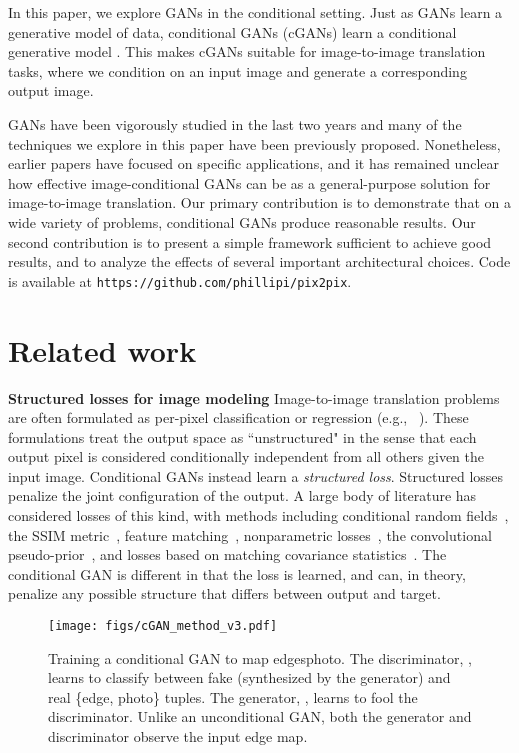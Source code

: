 \documentclass[10pt,twocolumn,letterpaper]{article}
\begin{document}
In this paper, we explore GANs in the conditional setting. Just as GANs learn a generative model of data, conditional GANs (cGANs) learn a conditional generative model \cite{goodfellow2014generative}. This makes cGANs suitable for image-to-image translation tasks, where we condition on an input image and generate a corresponding output image.

GANs have been vigorously studied in the last two years and many of the techniques we explore in this paper have been previously proposed. Nonetheless, earlier papers have focused on specific applications, and it has remained unclear how effective image-conditional GANs can be as a general-purpose solution for image-to-image translation. Our primary contribution is to demonstrate that on a wide variety of problems, conditional GANs produce reasonable results. Our second contribution is to present a simple framework sufficient to achieve good results, and to analyze the effects of several important architectural choices. Code is available at \texttt{https://github.com/phillipi/pix2pix}.


\section{Related work}

{\bf Structured losses for image modeling} Image-to-image translation problems are often formulated as per-pixel classification or regression (e.g., ~\cite{long2015fully,xie2015holistically,iizuka2016let,larsson2016learning,zhang2016colorful}). These formulations treat the output space as ``unstructured" in the sense that each output pixel is considered conditionally independent from all others given the input image. Conditional GANs instead learn a \emph{structured loss}. Structured losses penalize the joint configuration of the output. A large body of literature has considered losses of this kind, with methods including conditional random fields~\cite{chen14semantic}, the SSIM metric~\cite{wang2004image}, feature matching~\cite{dosovitskiy2016generating}, nonparametric losses~\cite{li2016combining}, the convolutional pseudo-prior~\cite{xie2015convolutional}, and losses based on matching covariance statistics~\cite{johnson2016perceptual}. The conditional GAN is different in that the loss is learned, and can, in theory, penalize any possible structure that differs between output and target.

\begin{figure}[t]
 \centering
 \texttt{[image: figs/cGAN\_method\_v3.pdf]}
 \vspace{-0.2in}
  \caption{Training a conditional GAN to map edgesphoto. The discriminator, , learns to classify between fake (synthesized by the generator) and real \{edge, photo\} tuples. The generator, , learns to fool the discriminator. Unlike an unconditional GAN, both the generator and discriminator observe the input edge map.}
 \label{cGAN_method}
 \vspace{-0.2in}
\end{figure}
\end{document}

